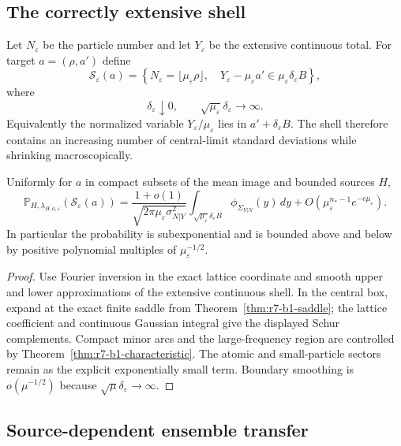 \subsection{The correctly extensive shell}

Let $N_\varepsilon$ be the particle number and let $Y_\varepsilon$ be the
extensive continuous total.  For target
$a=(\rho,a')$ define
\[
 \mathcal S_\varepsilon(a)=
 \left\{N_\varepsilon=\lfloor\mu_\varepsilon\rho\rfloor,
 \quad
 Y_\varepsilon-\mu_\varepsilon a'
   \in\mu_\varepsilon\delta_\varepsilon B\right\},
\]
where
\[
 \delta_\varepsilon\downarrow0,
 \qquad
 \sqrt{\mu_\varepsilon}\delta_\varepsilon\longrightarrow\infty.
\]
Equivalently the normalized variable
$Y_\varepsilon/\mu_\varepsilon$ lies in
$a'+\delta_\varepsilon B$.  The shell therefore contains an increasing number
of central-limit standard deviations while shrinking macroscopically.

\begin{theorem}
\label{thm:r7-b1-coefficient}
Uniformly for $a$ in compact subsets of the mean image and bounded sources
$H$,
\[
 \mathbb P_{H,\lambda_{H,a,\varepsilon}}
  (\mathcal S_\varepsilon(a))
 =\frac{1+o(1)}{
   \sqrt{2\pi\mu_\varepsilon\sigma_{N|Y}^2}}
 \int_{\sqrt{\mu_\varepsilon}\delta_\varepsilon B}
  \phi_{\Sigma_{Y|N}}(y)\,dy
 +O(\mu_\varepsilon^{n_*-1}e^{-c\mu_\varepsilon}).
\]
In particular the probability is subexponential and is bounded above and below
by positive polynomial multiples of $\mu_\varepsilon^{-1/2}$.
\end{theorem}

\begin{proof}
Use Fourier inversion in the exact lattice coordinate and smooth upper and
lower approximations of the extensive continuous shell.  In the central box,
expand at the exact finite saddle from
Theorem~\ref{thm:r7-b1-saddle}; the lattice coefficient and continuous
Gaussian integral give the displayed Schur complements.  Compact minor arcs
and the large-frequency region are controlled by
Theorem~\ref{thm:r7-b1-characteristic}.  The atomic and small-particle sectors
remain as the explicit exponentially small term.  Boundary smoothing is
$o(\mu^{-1/2})$ because
$\sqrt\mu\delta_\varepsilon\to\infty$.
\end{proof}

\subsection{Source-dependent ensemble transfer}

